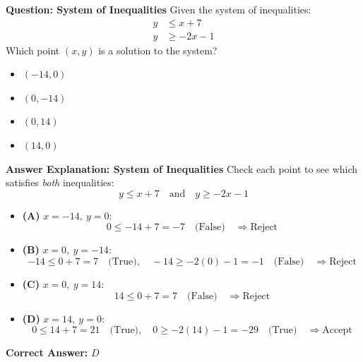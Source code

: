\documentclass{beamer}
\begin{document}
\begin{frame}{\textbf{Question: System of Inequalities}}
    \small
    Given the system of inequalities:
    \[
    \begin{aligned}
        y &\leq x + 7 \\
        y &\geq -2x - 1
    \end{aligned}
    \]
    Which point \((x, y)\) is a solution to the system?

    \vspace{0.5em}
    \begin{itemize}
        \item[\textbf{A.}] \((-14, 0)\)
        \item[\textbf{B.}] \((0, -14)\)
        \item[\textbf{C.}] \((0, 14)\)
        \item[\textbf{D.}] \((14, 0)\)
    \end{itemize}
\end{frame}

\begin{frame}{\textbf{Answer Explanation: System of Inequalities}}
    \small
    Check each point to see which satisfies \emph{both} inequalities:
    \[
    y \leq x + 7 \quad \text{and} \quad y \geq -2x - 1
    \]

    \begin{itemize}
        \item \textbf{(A)} \(x = -14,\ y = 0\):
        \[
        0 \leq -14 + 7 = -7 \quad \text{(False)} \quad \Rightarrow \text{Reject}
        \]

        \item \textbf{(B)} \(x = 0,\ y = -14\):
        \[
        -14 \leq 0 + 7 = 7 \quad \text{(True)}, \quad -14 \geq -2(0) - 1 = -1 \quad \text{(False)} \quad \Rightarrow \text{Reject}
        \]

        \item \textbf{(C)} \(x = 0,\ y = 14\):
        \[
        14 \leq 0 + 7 = 7 \quad \text{(False)} \quad \Rightarrow \text{Reject}
        \]

        \item \textbf{(D)} \(x = 14,\ y = 0\):
        \[
        0 \leq 14 + 7 = 21 \quad \text{(True)}, \quad 0 \geq -2(14) - 1 = -29 \quad \text{(True)} \quad \Rightarrow \text{Accept}
        \]
    \end{itemize}

    \textbf{Correct Answer:} \( \boxed{D} \)
\end{frame}
\end{document}
